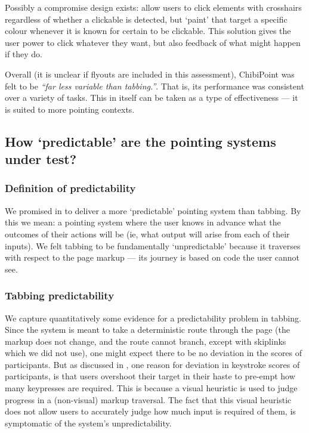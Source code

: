 \documentclass[11pt,openright,a4paper]{report}
\begin{document}
Possibly a compromise design exists: allow users to click elements with crosshairs regardless of whether a clickable is detected, but `paint' that target a specific colour whenever it is known for certain to be clickable. This solution gives the user power to click whatever they want, but also feedback of what might happen if they do.

Overall (it is unclear if flyouts are included in this assessment), ChibiPoint was felt to be \textit{``far less variable than tabbing.''}. That is, its performance was consistent over a variety of tasks. This in itself can be taken as a type of effectiveness --- it is suited to more pointing contexts.

\subsection{How `predictable' are the pointing systems under test?}
\subsubsection{Definition of predictability}
We promised in  to deliver a more `predictable' pointing system than tabbing. By this we mean: a pointing system where the user knows in advance what the outcomes of their actions will be (ie, what output will arise from each of their inputs). We felt tabbing to be fundamentally `unpredictable' because it traverses with respect to the page markup --- its journey is based on code the user cannot see. 

\subsubsection{Tabbing predictability}
We capture quantitatively some evidence for a predictability problem in tabbing. Since the system is meant to take a deterministic route through the page (the markup does not change, and the route cannot branch, except with skiplinks which we did not use), one might expect there to be no deviation in the scores of participants. But as discussed in , one reason for deviation in keystroke scores of participants, is that users overshoot their target in their haste to pre-empt how many keypresses are required. This is because a visual heuristic is used to judge progress in a (non-visual) markup traversal. The fact that this visual heuristic does not allow users to accurately judge how much input is required of them, is symptomatic of the system's unpredictability.
\end{document}
